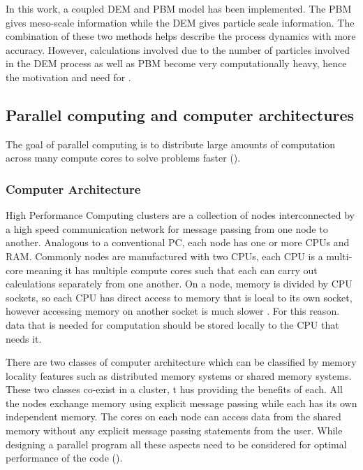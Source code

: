 \documentclass[preprint,11pt,authoryear]{elsarticle}
\begin{document}
In this work, a coupled DEM and PBM model has been implemented. The PBM gives 
meso-scale 
information while the DEM gives particle scale information. The combination of these two methods helps 
describe the process dynamics with more accuracy. However, calculations involved due to the number 
of particles involved in the DEM process as well as PBM become very computationally heavy, hence the
motivation and need for . 

\subsection{Parallel computing and computer architectures}
 The goal of parallel computing is to distribute large amounts of computation across many 
compute cores to solve problems faster (\cite{wilkinson2005}).
\subsubsection{Computer Architecture}
High Performance Computing clusters are a collection of nodes interconnected by a high speed 
communication network for message passing from one node to another. Analogous to a conventional 
PC, each node has one or more CPUs and RAM. Commonly nodes are manufactured with two CPUs, each CPU 
is a multi-core meaning it has multiple compute cores such that each can carry out calculations 
separately from one another. %
On a node, memory is divided by CPU sockets, so each CPU has direct access to memory that is local to 
its own socket, however accessing memory on another socket is much slower \cite{Jin2011}. 
For this reason. data that is needed for computation should be stored locally to the CPU that needs it.  

There are two classes of computer architecture which can be classified by memory locality features such as 
distributed memory systems or shared memory systems. These two classes co-exist in a cluster, 
t hus providing the benefits of each. All the nodes exchange memory using explicit message passing 
while each has its own independent memory. The cores on each node can access data from the 
shared memory without any explicit message passing statements from the user. While designing a 
parallel program all these aspects need to be considered for optimal performance of the code 
(\cite{Adhianto2007}).
\end{document}
